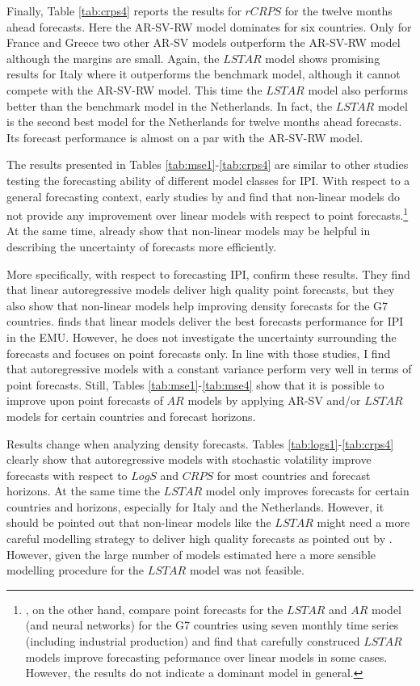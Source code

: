 \documentclass[12pt,letterpaper,fleqn]{article}           %
\begin{document}
Finally, Table \ref{tab:crps4} reports the results for $rCRPS$ for the twelve months ahead forecasts. Here the AR-SV-RW model dominates for six countries. Only for France and Greece two other AR-SV models outperform the AR-SV-RW model although the margins are small. Again, the $LSTAR$ model shows promising results for Italy where it outperforms the benchmark model, although it cannot compete with the AR-SV-RW model. This time the $LSTAR$ model also performs better than the benchmark model in the Netherlands. In fact, the $LSTAR$ model is the second best model for the Netherlands for twelve months ahead forecasts. Its forecast performance is almost on a par with the AR-SV-RW model.

The results presented in Tables \ref{tab:mse1}-\ref{tab:crps4} are similar to other studies testing the forecasting ability of different model classes for IPI. With respect to a general forecasting context, early studies by \textcite{deg92} and \textcite{ramsey96} find that non-linear models do not provide any improvement over linear models with respect to point forecasts.\footnote{\textcite{ter05}, on the other hand, compare point forecasts for the $LSTAR$ and $AR$ model (and neural networks) for the G7 countries using seven monthly time series (including industrial production) and find that carefully construced $LSTAR$ models improve forecasting peformance over linear models in some cases. However, the results do not indicate a dominant model in general.}  At the same time, \textcite{pes97} already show that non-linear models may be helpful in describing the uncertainty of forecasts more efficiently.   

More specifically, with respect to forecasting IPI, \textcite{dijk03} confirm these results. They find that linear autoregressive models deliver high quality point forecasts, but they also show that non-linear models help improving density forecasts for the G7 countries. \textcite{marc02} finds that linear models deliver the best forecasts performance for IPI in the EMU. However, he does not investigate the uncertainty surrounding the forecasts and focuses on point forecasts only. In line with those studies, I find that autoregressive models with a constant variance perform very well in terms of point forecasts. Still, Tables \ref{tab:mse1}-\ref{tab:mse4} show that it is possible to improve upon point forecasts of $AR$ models by applying AR-SV and/or $LSTAR$ models for certain countries and forecast horizons. 

Results change when analyzing density forecasts. Tables \ref{tab:logs1}-\ref{tab:crps4} clearly show that autoregressive models with stochastic volatility improve forecasts with respect to $LogS$ and $CRPS$ for most countries and forecast horizons. At the same time the $LSTAR$ model only improves forecasts for certain countries and horizons, especially for Italy and the Netherlands. However, it should be pointed out that non-linear models like the $LSTAR$ might need a more careful modelling strategy to deliver high quality forecasts as pointed out by \textcite{ter05}. However, given the large number of models estimated here a more sensible modelling procedure for the $LSTAR$ model was not feasible.
\end{document}
